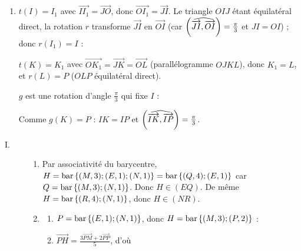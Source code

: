 \begin{description}
\begin{enumerate}
\begin{enumerate}
				\par\noindent{}
			\item {}
				$t(I) = I_1$ avec $\overrightarrow{II_1} = \overrightarrow{JO}$, donc $\overrightarrow{OI_1} = \overrightarrow{JI}$.
				Le triangle $OIJ$ étant équilatéral direct, la rotation $r$ transforme $\overrightarrow{JI}$ en $\overrightarrow{OI}$
				(car $\left( \widehat{ \overrightarrow{JI} , \overrightarrow{OI} } \right) = \frac{\pi}{3}$ et $JI = OI$) ; donc $r(I_1) = I$ : \par\noindent{}
				$t(K) = K_1$ avec $\overrightarrow{OK_1} = \overrightarrow{JK} = \overrightarrow{OL}$ (parallélogramme $OJKL$), donc $K_1 = L$, et $r(L) = P$ ($OLP$ équilatéral direct).
				\par\noindent{}
				$g$ est une rotation d'angle $\frac{\pi}{3}$ qui fixe $I$ :
				\par\noindent{}
				Comme $g(K) = P$ : $IK = IP$ et $\left( \widehat{ \overrightarrow{IK} , \overrightarrow{IP} } \right) = \frac{\pi}{3}$.
				\par\noindent{}
		\end{enumerate}
	\end{enumerate}
	\item[Partie C]
	\begin{description}
		\item[I.]
		\begin{enumerate}
			\item {}
				Par associativité du barycentre, $H = \mathrm{bar}\left\lbrace (M,3);(E,1);(N,1) \right\rbrace = \mathrm{bar}\left\lbrace (Q,4);(E,1) \right\rbrace$ car $Q = \mathrm{bar}\left\lbrace (M,3);(N,1) \right\rbrace$.
				Donc $H \in (EQ)$. De même $H = \mathrm{bar}\left\lbrace (R,4);(N,1) \right\rbrace$, donc $H \in (NR)$.
				\par\noindent{}
			\item
			\begin{enumerate}
				\item {}
					$P = \mathrm{bar}\left\lbrace (E,1);(N,1) \right\rbrace$, donc $H = \mathrm{bar}\left\lbrace (M,3);(P,2) \right\rbrace$ : \par\noindent{}
				\item {}
					$\overrightarrow{PH} = \frac{3\overrightarrow{PM} + 2\overrightarrow{PP}}{5}$, d'où \par\noindent{}

\end{enumerate}
\end{enumerate}
\end{description}
\end{description}
